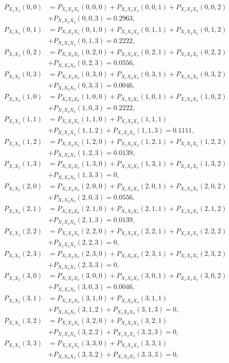 \documentclass[
  letterpaper,
  DIV=11,
  numbers=noendperiod]{scrreprt}
\begin{document}
\[
\begin{array}{rl}
P_{X_1X_2}(0,0) 
& = P_{X_1X_2X_3}(0,0,0)+P_{X_1X_2X_3}(0,0,1)+P_{X_1X_2X_3}(0,0,2)\\
& +P_{X_1X_2X_3}(0,0,3)=0.2963, \\
P_{X_1X_2}(0,1) & = P_{X_1X_2X_3}(0,1,0)+P_{X_1X_2X_3}(0,1,1)+P_{X_1X_2X_3}(0,1,2)\\
& +P_{X_1X_2X_3}(0,1,3)=0.2222, \\
P_{X_1X_2}(0,2) & = P_{X_1X_2X_3}(0,2,0)+P_{X_1X_2X_3}(0,2,1)+P_{X_1X_2X_3}(0,2,2)\\
& +P_{X_1X_2X_3}(0,2,3)=0.0556, \\
P_{X_1X_2}(0,3) & = P_{X_1X_2X_3}(0,3,0)+P_{X_1X_2X_3}(0,3,1)+P_{X_1X_2X_3}(0,3,2)\\
& +P_{X_1X_2X_3}(0,3,3)=0.0046, \\
P_{X_1X_2}(1,0) & = P_{X_1X_2X_3}(1,0,0)+P_{X_1X_2X_3}(1,0,1)+P_{X_1X_2X_3}(1,0,2)\\
& +P_{X_1X_2X_3}(1,0,3)=0.2222, \\
P_{X_1X_2}(1,1) & = P_{X_1X_2X_3}(1,1,0)+P_{X_1X_2X_3}(1,1,1)\\
& +P_{X_1X_2X_3}(1,1,2)+P_{X_1X_2X_3}(1,1,3)=0.1111, \\
P_{X_1X_2}(1,2) & = P_{X_1X_2X_3}(1,2,0)+P_{X_1X_2X_3}(1,2,1)+P_{X_1X_2X_3}(1,2,2)\\
& +P_{X_1X_2X_3}(1,2,3)=0.0139, \\
P_{X_1X_2}(1,3) & = P_{X_1X_2X_3}(1,3,0)+P_{X_1X_2X_3}(1,3,1)+P_{X_1X_2X_3}(1,3,2)\\
& +P_{X_1X_2X_3}(1,3,3)=0, \\
P_{X_1X_2}(2,0) & = P_{X_1X_2X_3}(2,0,0)+P_{X_1X_2X_3}(2,0,1)+P_{X_1X_2X_3}(2,0,2)\\
& +P_{X_1X_2X_3}(2,0,3)=0.0556, \\
P_{X_1X_2}(2,1) & = P_{X_1X_2X_3}(2,1,0)+P_{X_1X_2X_3}(2,1,1)+P_{X_1X_2X_3}(2,1,2)\\
& +P_{X_1X_2X_3}(2,1,3)=0.0139, \\
P_{X_1X_2}(2,2) & = P_{X_1X_2X_3}(2,2,0)+P_{X_1X_2X_3}(2,2,1)+P_{X_1X_2X_3}(2,2,2)\\
& +P_{X_1X_2X_3}(2,2,3)=0, \\
P_{X_1X_2}(2,3) & = P_{X_1X_2X_3}(2,3,0)+P_{X_1X_2X_3}(2,3,1)+P_{X_1X_2X_3}(2,3,2)\\
& +P_{X_1X_2X_3}(2,3,3)=0, \\
P_{X_1X_2}(3,0) 
& = P_{X_1X_2X_3}(3,0,0)+P_{X_1X_2X_3}(3,0,1)+P_{X_1X_2X_3}(3,0,2)\\
& +P_{X_1X_2X_3}(3,0,3)=0.0046, \\
P_{X_1X_2}(3,1) & = P_{X_1X_2X_3}(3,1,0)+P_{X_1X_2X_3}(3,1,1)\\
& +P_{X_1X_2X_3}(3,1,2)+P_{X_1X_2X_3}(3,1,3)=0, \\
P_{X_1X_2}(3,2) & = P_{X_1X_2X_3}(3,2,0)+P_{X_1X_2X_3}(3,2,1)\\
& + P_{X_1X_2X_3}(3,2,2)+P_{X_1X_2X_3}(3,2,3)=0, \\
P_{X_1X_2}(3,3) & = P_{X_1X_2X_3}(3,3,0)+P_{X_1X_2X_3}(3,3,1)\\
& + P_{X_1X_2X_3}(3,3,2)+P_{X_1X_2X_3}(3,3,3)=0, \\
\end{array}
\]
\end{document}
